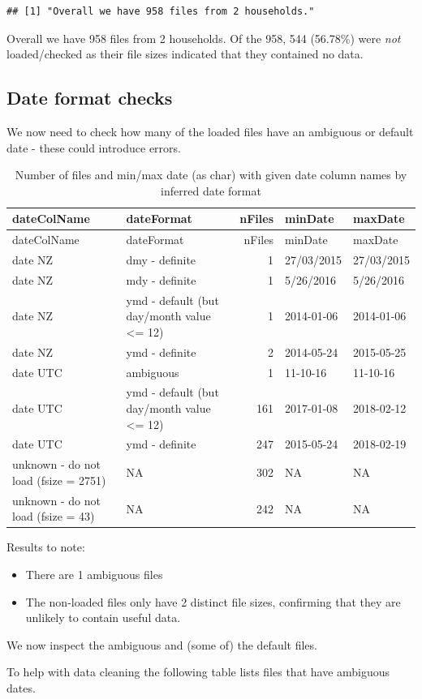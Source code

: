 \documentclass[]{article}
\providecommand{\tightlist}{%
  \setlength{\itemsep}{0pt}\setlength{\parskip}{0pt}}
\begin{document}
\begin{verbatim}
## [1] "Overall we have 958 files from 2 households."
\end{verbatim}

Overall we have 958 files from 2 households. Of the 958, 544 (56.78\%)
were \emph{not} loaded/checked as their file sizes indicated that they
contained no data.

\subsection{Date format checks}\label{date-format-checks}

We now need to check how many of the loaded files have an ambiguous or
default date - these could introduce errors.

\begin{longtable}[]{@{}llrll@{}}
\caption{Number of files and min/max date (as char) with given date
column names by inferred date format}\tabularnewline
\toprule
dateColName & dateFormat & nFiles & minDate & maxDate\tabularnewline
\midrule
\endfirsthead
\toprule
dateColName & dateFormat & nFiles & minDate & maxDate\tabularnewline
\midrule
\endhead
date NZ & dmy - definite & 1 & 27/03/2015 & 27/03/2015\tabularnewline
date NZ & mdy - definite & 1 & 5/26/2016 & 5/26/2016\tabularnewline
date NZ & ymd - default (but day/month value \textless{}= 12) & 1 &
2014-01-06 & 2014-01-06\tabularnewline
date NZ & ymd - definite & 2 & 2014-05-24 & 2015-05-25\tabularnewline
date UTC & ambiguous & 1 & 11-10-16 & 11-10-16\tabularnewline
date UTC & ymd - default (but day/month value \textless{}= 12) & 161 &
2017-01-08 & 2018-02-12\tabularnewline
date UTC & ymd - definite & 247 & 2015-05-24 & 2018-02-19\tabularnewline
unknown - do not load (fsize = 2751) & NA & 302 & NA & NA\tabularnewline
unknown - do not load (fsize = 43) & NA & 242 & NA & NA\tabularnewline
\bottomrule
\end{longtable}

Results to note:

\begin{itemize}
\tightlist
\item
  There are 1 ambiguous files
\item
  The non-loaded files only have 2 distinct file sizes, confirming that
  they are unlikely to contain useful data.
\end{itemize}

We now inspect the ambiguous and (some of) the default files.

To help with data cleaning the following table lists files that have
ambiguous dates.
\end{document}

